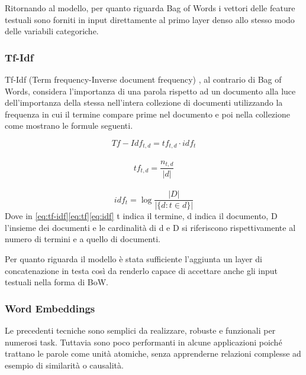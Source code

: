 Ritornando al modello, per quanto riguarda Bag of Words i vettori delle feature
testuali sono forniti in input direttamente al primo layer denso allo stesso
modo delle variabili categoriche.

\subsubsection{Tf-Idf}\label{section-tfidf} Tf-Idf (Term frequency-Inverse
document frequency) \cite{manning_raghavan_schutze_2008}, al contrario di Bag of
Words, considera l'importanza di una parola rispetto ad un documento alla luce
dell'importanza della stessa nell'intera collezione di documenti utilizzando la
frequenza in cui il termine compare prime nel documento e poi nella collezione
come mostrano le formule seguenti.%

\begin{equation}
\label{eq:tf-idf}
   Tf-Idf_{t,d} = tf_{t,d} \cdot idf_t
\end{equation}
\\
\begin{equation}
\label{eq:tf}
   tf_{t,d} = \frac{n_{t,d}}{|d|} 
\end{equation}
\\
\begin{equation}
\label{eq:idf}
   idf_{t} = \log \frac{|D|}{|\{d: t \in d\}|} 
\end{equation}
Dove in \eqref{eq:tf-idf}\eqref{eq:tf}\eqref{eq:idf} t indica il termine, d
indica il documento, D l'insieme dei documenti e le cardinalità di d e D si
riferiscono rispettivamente al numero di termini e a quello di documenti.



Per quanto riguarda il modello è stata sufficiente l'aggiunta un layer di
concatenazione in testa così da renderlo capace di accettare anche gli input
testuali nella forma di BoW.


\subsubsection{Word Embeddings}

Le precedenti tecniche sono semplici da realizzare, robuste e funzionali per
numerosi task. Tuttavia sono poco performanti in alcune applicazioni poiché
trattano le parole come unità atomiche, senza apprenderne relazioni complesse
ad esempio di similarità o causalità.

